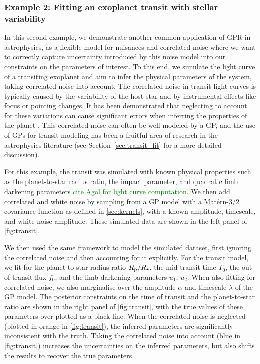 \documentclass[letterpaper]{ar-1col}
\newcommand{\dan}[1]{\textcolor{green}{#1}}
\newcommand{\amplitude}{\ensuremath{\alpha}}
\newcommand{\lengthscale}{\ensuremath{\lambda}}
\begin{document}
\subsubsection{Example 2: Fitting an exoplanet transit with stellar variability}
\label{sec:transit}

In this second example, we demonstrate another common application of GPR in astrophysics, as a flexible model for nuisances and correlated noise where we want to correctly capture uncertainty introduced by this noise model into our constraints on the parameters of interest.
To this end, we simulate the light curve of a transiting exoplanet and aim to infer the physical parameters of the system, taking correlated noise into account.
The correlated noise in transit light curves is typically caused by the variability of the host star and by instrumental effects like focus or pointing changes.
It has been demonstrated that neglecting to account for these variations can cause significant errors when inferring the properties of the planet \citep{2006MNRAS.373..231P,2007A&A...472L..13G}.
This correlated noise can often be well-modeled by a GP, and the use of GPs for transit modeling has been a fruitful area of research in the astrophysics literature (see Section~\ref{sec:transit_fit} for a more detailed discussion).

For this example, the transit was simulated with known physical properties such as the planet-to-star radius ratio, the impact parameter, and quadratic limb darkening parameters \dan{cite Agol for light curve computation}.
We then add correlated and white noise by sampling from a GP model with a Mat\'ern-3/2 covariance function as defined in \autoref{sec:kernels}, with a known amplitude, timescale, and white noise amplitude.
These simulated data are shown in the left panel of \autoref{fig:transit}.

We then used the same framework to model the simulated dataset, first ignoring the correlated noise and then accounting for it explicitly.
For the transit model, we fit for the planet-to-star radius ratio $R_{\rm p}/R_\star$, the mid-transit time $T_0$, the out-of-transit flux $f_0$, and the limb darkening parameters $u_1,\,u_2$.
When also fitting for correlated noise, we also marginalise over the amplitude $\amplitude$ and timescale $\lengthscale$ of the GP model.
The posterior constraints on the time of transit and the planet-to-star ratio are shown in the right panel of \autoref{fig:transit}, with the true values of these parameters over-plotted as a black line.
When the correlated noise is neglected (plotted in orange in \autoref{fig:transit}), the inferred parameters are significantly inconsistent with the truth.
Taking the correlated noise into account (blue in \autoref{fig:transit}) increases the uncertainties on the inferred parameters, but also shifts the results to recover the true parameters.
\end{document}
